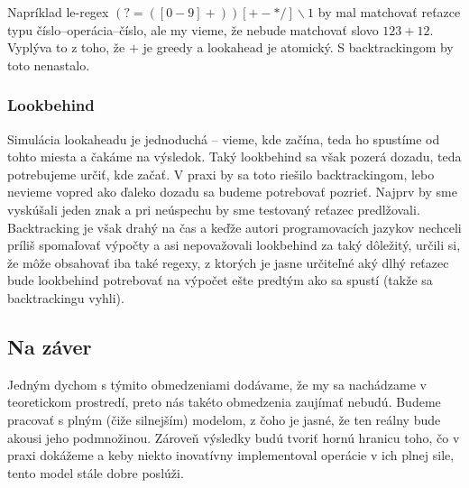 Napríklad le-regex $(?=([0-9]+))[+-*/]\backslash 1$ by mal matchovať reťazce typu číslo--operácia--číslo, ale my vieme, že nebude matchovať slovo $123+12$. Vyplýva to z toho, že $+$ je greedy a lookahead je atomický. S backtrackingom by toto nenastalo.

\subsubsection{Lookbehind}
\label{praxlb}

Simulácia lookaheadu je jednoduchá -- vieme, kde začína, teda ho spustíme od tohto miesta a čakáme na výsledok. Taký lookbehind sa však pozerá dozadu, teda potrebujeme určiť, kde začať. V praxi by sa toto riešilo backtrackingom, lebo nevieme vopred ako ďaleko dozadu sa budeme potrebovať pozrieť. Najprv by sme vyskúšali jeden znak a pri neúspechu by sme testovaný reťazec predlžovali. Backtracking je však drahý na čas a keďže autori programovacích jazykov nechceli príliš spomaľovať výpočty a asi nepovažovali lookbehind za taký dôležitý, určili si, že môže obsahovať iba také regexy, z ktorých je jasne určiteľné aký dlhý reťazec bude lookbehind potrebovať na výpočet ešte predtým ako sa spustí (takže sa backtrackingu vyhli)\cite{LApracticalnote}. 

\subsection*{Na záver}
\label{praxzaver}

Jedným dychom s týmito obmedzeniami dodávame, že my sa nachádzame v teo\-re\-tic\-kom prostredí, preto nás takéto obmedzenia zaujímať nebudú. Budeme pracovať s plným (čiže silnejším) modelom, z čoho je jasné, že ten reálny bude akousi jeho pod\-mno\-ži\-nou. Zároveň výsledky budú tvoriť hornú hranicu toho, čo v praxi dokážeme a keby niekto inovatívny implementoval operácie v ich plnej sile, tento model stále dobre poslúži.